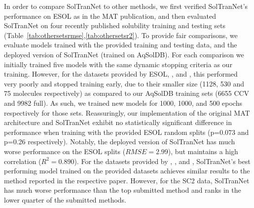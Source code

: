 \documentclass[journal=jcim,manuscript=applicationnotes]{achemso}
\begin{document}
In order to compare SolTranNet to other methods, we first verified SolTranNet's performance on ESOL\cite{esol} as in the MAT publication, and then evaluated SolTranNet on four recently published solubility training and testing sets\cite{lovric,boobier,cui,llinas} (Table~\ref{tab:othersetsrmse},\ref{tab:othersetsr2}).
To provide fair comparisons, we evaluate models trained with the provided training and testing data, and the deployed version of SolTranNet (trained on AqSolDB).
For each comparison we initially trained five models with the same dynamic stopping criteria as our training.
However, for the datasets provided by ESOL\cite{esol}, \citet{lovric}, and \citet{boobier}, this performed very poorly and stopped training early, due to their smaller size  (1128, 530 and 75 molecules respectively) as compared to our AqSolDB training sets (6655 CCV and 9982 full).
As such, we trained new models for 1000, 1000, and 500 epochs respectively for those sets.
Reassuringly, our implementation of the original MAT architecture and SolTranNet exhibit no statistically significant difference in performance when training with the provided ESOL random splits (p=0.073 and p=0.26 respectively).
Notably, the deployed version of SolTranNet has much worse performance on the ESOL splits ($RMSE=2.99$), but maintains a high correlation ($R^2=0.890$).
For the datasets provided by \citet{cui}, \citet{lovric}, and \citet{boobier}, SolTranNet's best performing model trained on the provided datasets achieves similar results to the method reported in the respective paper.
However, for the SC2 data\cite{llinas}, SolTranNet has much worse performance than the top submitted method and ranks in the lower quarter of the submitted methods.
\end{document}
